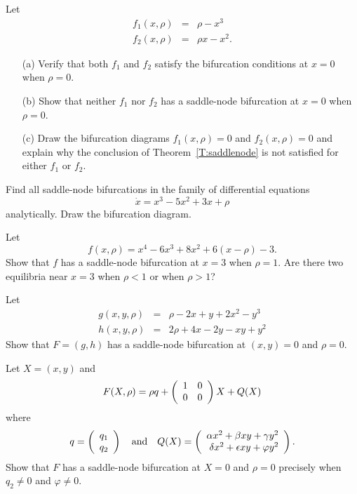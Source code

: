 \documentclass{ximera}
\begin{document}
\begin{exercise} \label{c9.3.1}
Let 
\begin{eqnarray*}
f_1(x,\rho) & = & \rho - x^3 \\
f_2(x,\rho) & = & \rho x - x^2.
\end{eqnarray*}
\begin{itemize}
\item[(a)] Verify that both $f_1$ and $f_2$ satisfy the bifurcation conditions 
 at $x=0$ when $\rho=0$.
\item[(b)] Show that neither $f_1$ nor $f_2$ has a saddle-node bifurcation
at $x=0$ when $\rho=0$. 
\item[(c)] Draw the bifurcation diagrams $f_1(x,\rho)=0$ and 
$f_2(x,\rho)=0$ and explain why the conclusion of 
Theorem~\ref{T:saddlenode} is not satisfied for either $f_1$ 
or $f_2$.
\end{itemize}
\end{exercise}

\begin{exercise} \label{c9.3.5}
Find all saddle-node bifurcations in the 
family of differential equations
\begin{equation}
\dot{x} = x^3 -5x^2 + 3x + \rho
\end{equation}
analytically.  Draw the bifurcation diagram.
\end{exercise}

\begin{exercise} \label{c9.3.2}
Let 
\[
f(x,\rho) = x^4 - 6x^3 +8x^2 + 6(x-\rho) - 3.
\]
Show that $f$ has a saddle-node bifurcation at $x=3$ when $\rho=1$. 
Are there two equilibria near $x=3$ when $\rho<1$ or when $\rho>1$?
\end{exercise}

\begin{exercise} \label{c9.3.3}
Let 
\begin{eqnarray*}
g(x,y,\rho) & = &  \rho - 2x +  y + 2x^2 - y^3 \\
h(x,y,\rho) & = & 2\rho + 4x - 2y -  xy  + y^2
\end{eqnarray*}
Show that $F=(g,h)$ has a saddle-node bifurcation at $(x,y)=0$ and 
$\rho=0$.
\end{exercise}


\begin{exercise} \label{c9.3.4}
Let $X=(x,y)$ and 
\[
F(X,\rho) = \rho q + \left(\begin{array}{rr} 1 & 0\\ 0 &0\end{array}\right) X + Q(X)
\]
where
\[
q=\left(\begin{array}{r} q_1 \\ q_2\end{array}\right) \quad\mbox{and}\quad Q(X) = \left(\begin{array}{r} \alpha x^2+\beta xy+\gamma y^2 \\ \delta x^2 +\epsilon xy+\varphi y^2\end{array}\right).
\]
Show that $F$ has a saddle-node bifurcation at $X=0$ and $\rho=0$ precisely 
when $q_2\neq 0$ and $\varphi\neq 0$. 
\end{exercise}
\end{document}
